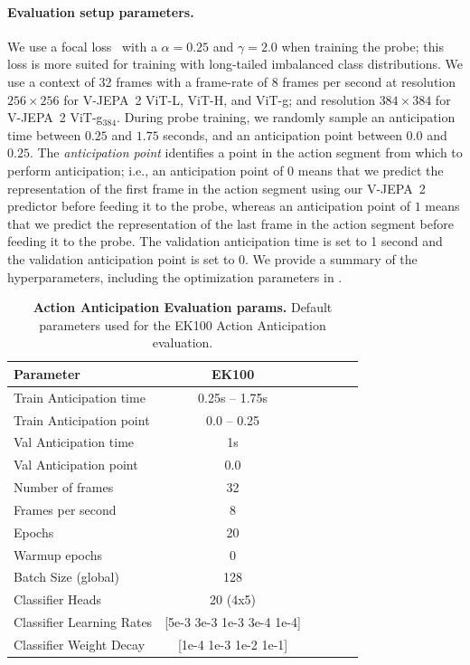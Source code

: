 \documentclass[]{fairmeta}
\newcommand{\model}{V-JEPA~2\xspace}
\begin{document}
\paragraph{\bf Evaluation setup parameters.} 
We use a focal loss~\citep{lin2017focal} with a $\alpha=0.25$ and $\gamma=2.0$ when training the probe; this loss is more suited for training with long-tailed imbalanced class distributions.
We use a context of 32 frames with a frame-rate of 8 frames per second at resolution $256\times256$ for \model ViT-L, ViT-H, and ViT-g; and resolution $384\times384$ for \model ViT-g$_{384}$.
During probe training, we randomly sample an anticipation time between $0.25$ and $1.75$ seconds, and an anticipation point between $0.0$ and $0.25$.
The \emph{anticipation point} identifies a point in the action segment from which to perform anticipation; i.e., an anticipation point of $0$ means that we predict the representation of the first frame in the action segment using our \model predictor before feeding it to the probe, whereas an anticipation point of $1$ means that we predict the representation of the last frame in the action segment before feeding it to the probe.
The validation anticipation time is set to 1 second and the validation anticipation point is set to $0$.
We provide a summary of the hyperparameters, including the optimization parameters in .

\begin{table}[ht!]
    \small
    \caption{\small{\bf Action Anticipation Evaluation params.} Default parameters used for the EK100 Action Anticipation evaluation.}
    \centering
    \label{tab:action_anticipation_params}
    \begin{tabular}{l c c c c c}
      \bf Parameter & \bf EK100 \\
        \toprule
        Train Anticipation time & 0.25s -- 1.75s \\
        Train Anticipation point & 0.0 -- 0.25 \\
        Val Anticipation time & 1s \\
        Val Anticipation point & 0.0 \\
        Number of frames & 32 \\
        Frames per second & 8 \\
        Epochs & 20 \\
        Warmup epochs & 0 \\
        Batch Size (global) & 128 \\
        Classifier Heads & 20 (4x5)  \\
        Classifier Learning Rates & [5e-3 3e-3 1e-3 3e-4 1e-4] \\
        Classifier Weight Decay & [1e-4 1e-3 1e-2 1e-1]  \\
        \bottomrule
    \end{tabular}
\end{table}
\end{document}
